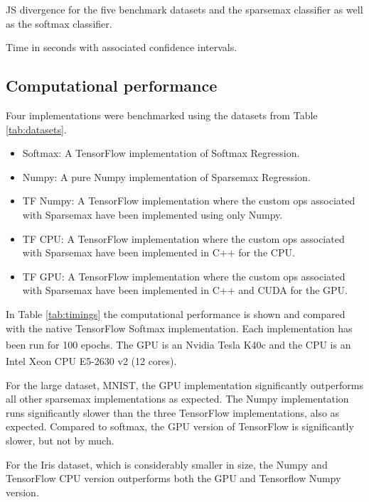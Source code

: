 \begin{table}[H]
\centering

\caption{JS divergence for the five benchmark datasets and the sparsemax classifier as well as the softmax classifier.}
\label{tab:results}
\end{table}

\begin{table}
\centering

\caption{Time in seconds with associated confidence intervals.}
\label{tab:timings}
\end{table}

\subsection{Computational performance}
Four implementations were benchmarked using the datasets from Table \ref{tab:datasets}.
\begin{itemize}
\setlength\itemsep{-0.3em}
\item Softmax: A TensorFlow implementation of Softmax Regression.
\item Numpy: A pure Numpy implementation of Sparsemax Regression.
\item TF Numpy: A TensorFlow implementation where the custom ops associated with Sparsemax have been implemented using only Numpy.
\item TF CPU: A TensorFlow implementation where the custom ops associated with Sparsemax have been implemented in C++ for the CPU.
\item TF GPU: A TensorFlow implementation where the custom ops associated with Sparsemax have been implemented in C++ and CUDA for the GPU.
\end{itemize}

In Table \ref{tab:timings} the computational performance is shown and compared with the native TensorFlow Softmax implementation. Each implementation has been run for 100 epochs. The GPU is an Nvidia\textsuperscript{\textregistered} Tesla K40c and the CPU is an Intel\textsuperscript{\textregistered} Xeon\textsuperscript{\textregistered} CPU E5-2630 v2 (12 cores).

For the large dataset, MNIST, the GPU implementation significantly outperforms all other sparsemax implementations as expected. The Numpy implementation runs significantly slower than the three TensorFlow implementations, also as expected. Compared to softmax, the GPU version of TensorFlow is significantly slower, but not by much.

For the Iris dataset, which is considerably smaller in size, the Numpy and TensorFlow CPU version outperforms both the GPU and Tensorflow Numpy version.

